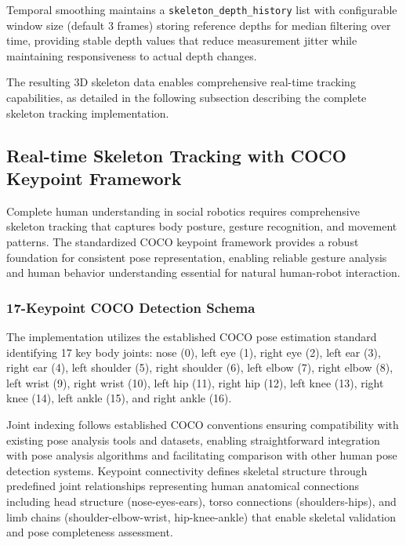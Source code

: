 Temporal smoothing maintains a \texttt{skeleton\_depth\_history} list with configurable window size (default 3 frames) storing reference depths for median filtering over time, providing stable depth values that reduce measurement jitter while maintaining responsiveness to actual depth changes.

The resulting 3D skeleton data enables comprehensive real-time tracking capabilities, as detailed in the following subsection describing the complete skeleton tracking implementation.



\subsection{Real-time Skeleton Tracking with COCO Keypoint Framework}

Complete human understanding in social robotics requires comprehensive skeleton tracking that captures body posture, gesture recognition, and movement patterns. The standardized COCO keypoint framework provides a robust foundation for consistent pose representation, enabling reliable gesture analysis and human behavior understanding essential for natural human-robot interaction.

\subsubsection{17-Keypoint COCO Detection Schema}

The implementation utilizes the established COCO pose estimation standard identifying 17 key body joints: nose (0), left eye (1), right eye (2), left ear (3), right ear (4), left shoulder (5), right shoulder (6), left elbow (7), right elbow (8), left wrist (9), right wrist (10), left hip (11), right hip (12), left knee (13), right knee (14), left ankle (15), and right ankle (16).

Joint indexing follows established COCO conventions ensuring compatibility with existing pose analysis tools and datasets, enabling straightforward integration with pose analysis algorithms and facilitating comparison with other human pose detection systems. Keypoint connectivity defines skeletal structure through predefined joint relationships representing human anatomical connections including head structure (nose-eyes-ears), torso connections (shoulders-hips), and limb chains (shoulder-elbow-wrist, hip-knee-ankle) that enable skeletal validation and pose completeness assessment.

